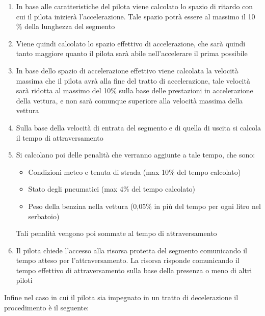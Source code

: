 \documentclass[a4paper,11pt, twoside]{book}
\begin{document}
	  \begin{enumerate}
	    \item In base alle caratteristiche del pilota viene calcolato lo spazio di ritardo con cui il
		  pilota inizierà l'accelerazione. Tale spazio potrà essere al massimo il 10$\%$ della lunghezza del segmento
	    \item Viene quindi calcolato lo spazio effettivo di accelerazione, che sarà quindi tanto maggiore quanto
		  il pilota sarà abile nell'accelerare il prima possibile
	    \item In base dello spazio di accelerazione effettivo viene calcolata la velocità massima che il pilota avrà alla fine del 
		  tratto di accelerazione,
		  tale velocità sarà ridotta al massimo del 10$\%$ sulla base delle prestazioni in accelerazione della vettura,
		  e non sarà comunque superiore alla velocità massima della vettura
	    \item Sulla base della velocità di entrata del segmento e di quella di uscita si calcola il tempo di attraversamento
	    \item Si calcolano poi delle penalità che verranno aggiunte a tale tempo, che sono:
		  \begin{itemize}
		    \item Condizioni meteo e tenuta di strada (max 10\% del tempo calcolato)
		    \item Stato degli pneumatici (max 4\% del tempo calcolato)
		    \item Peso della benzina nella vettura (0,05\% in più del tempo per ogni litro nel serbatoio)
		  \end{itemize}
		  Tali penalità vengono poi sommate al tempo di attraversamento
	    \item Il pilota chiede l'accesso alla risorsa protetta del segmento
		  comunicando il tempo atteso per l'attraversamento. La risorsa risponde comunicando il tempo
		  effettivo di attraversamento sulla base della presenza o meno di altri piloti
	  \end{enumerate}
	  
	  Infine nel caso in cui il pilota sia impegnato in un tratto di decelerazione il procedimento è il seguente:
	  
\end{document}
